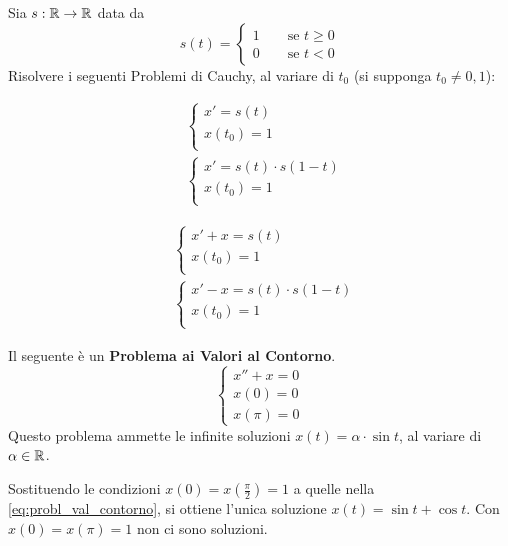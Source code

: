 \begin{exercise}
	Sia $s:\mathbb{R} \to \mathbb{R}$ data da
	\[s(t) =
	\begin{cases}
		1 \qquad \text{se } t \geq 0\\
		0 \qquad \text{se } t < 0
	\end{cases}\]
	Risolvere i seguenti Problemi di Cauchy, al variare di $t_0$ (si supponga $t_0 \neq 0,1$):

	\begin{minipage}{0.48\linewidth}
		\begin{align*}
			&\begin{cases}
				x' = s(t)\\
				x(t_0) = 1\\
			\end{cases}\\
			&\begin{cases}
				x' = s(t) \cdot s(1-t)\\
				x(t_0) = 1\\
			\end{cases}
		\end{align*}
	\end{minipage}
	\begin{minipage}{0.48\linewidth}
		\begin{align*}
			&\begin{cases}
				x' + x = s(t)\\
				x(t_0) = 1\\
			\end{cases}\\
			&\begin{cases}
				x' - x = s(t) \cdot s(1-t)\\
				x(t_0) = 1\\
			\end{cases}
		\end{align*}
	\end{minipage}
\end{exercise}
\begin{example}
	Il seguente è un \textbf{Problema ai Valori al Contorno}.
	\begin{equation}
		\label{eq:probl_val_contorno}
		\begin{cases}
			x'' + x = 0\\
			x(0) = 0\\
			x(\pi) = 0
		\end{cases}
	\end{equation}
	Questo problema ammette le infinite soluzioni $x(t) = \alpha \cdot \sin t$, al variare di $\alpha \in \mathbb{R}$.

	Sostituendo le condizioni $x(0) = x(\frac{\pi}{2}) = 1$ a quelle nella \cref{eq:probl_val_contorno}, si ottiene l'unica soluzione $x(t) = \sin t + \cos t$. Con $x(0) = x(\pi) = 1$ non ci sono soluzioni.
\end{example}

